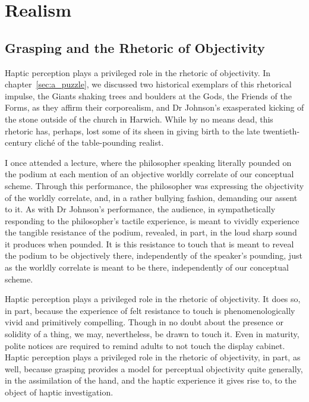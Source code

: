 \chapter{Realism} %
\label{cha:realism}

\section{Grasping and the Rhetoric of Objectivity} %
\label{sec:grasping_and_the_rhetoric_of_objectivity}

Haptic perception plays a privileged role in the rhetoric of objectivity. In chapter~\ref{sec:a_puzzle}, we discussed two historical exemplars of this rhetorical impulse, the Giants shaking trees and boulders at the Gods, the Friends of the Forms, as they affirm their corporealism, and Dr Johnson's exasperated kicking of the stone outside of the church in Harwich. While by no means dead, this rhetoric has, perhaps, lost some of its sheen in giving birth to the late twentieth-century clich\'{e} of the table-pounding realist.

I once attended a lecture, where the philosopher speaking literally pounded on the podium at each mention of an objective worldly correlate of our conceptual scheme. Through this performance, the philosopher was expressing the objectivity of the worldly correlate, and, in a rather bullying fashion, demanding our assent to it. As with Dr Johnson's performance, the audience, in sympathetically responding to the philosopher's tactile experience, is meant to vividly experience the tangible resistance of the podium, revealed, in part, in the loud sharp sound it produces when pounded. It is this resistance to touch that is meant to reveal the podium to be objectively there, independently of the speaker's pounding, just as the worldly correlate is meant to be there, independently of our conceptual scheme.

Haptic perception plays a privileged role in the rhetoric of objectivity. It does so, in part, because the experience of felt resistance to touch is phenomenologically vivid and primitively compelling. Though in no doubt about the presence or solidity of a thing, we may, nevertheless, be drawn to touch it. Even in maturity, polite notices are required to remind adults to not touch the display cabinet. Haptic perception plays a privileged role in the rhetoric of objectivity, in part, as well, because grasping provides a model for perceptual objectivity quite generally, in the assimilation of the hand, and the haptic experience it gives rise to, to the object of haptic investigation.


